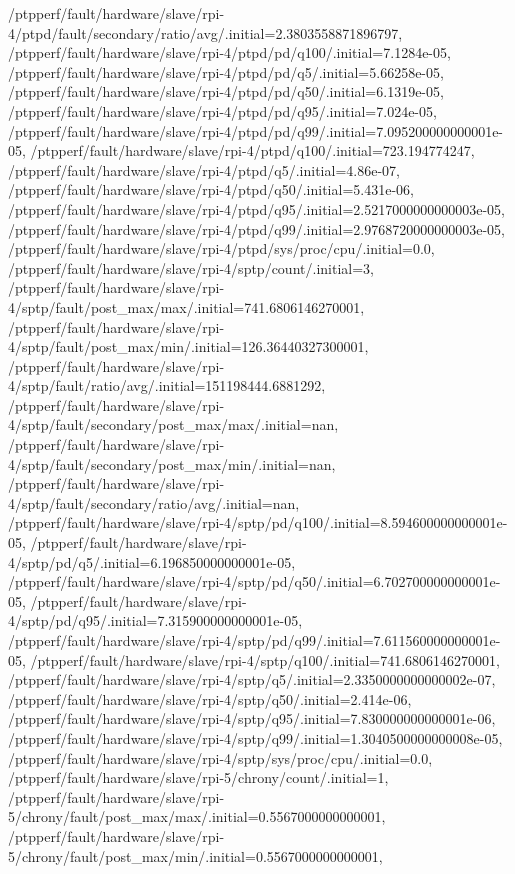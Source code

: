 {    /ptpperf/fault/hardware/slave/rpi-4/ptpd/fault/secondary/ratio/avg/.initial=2.3803558871896797,
    /ptpperf/fault/hardware/slave/rpi-4/ptpd/pd/q100/.initial=7.1284e-05,
    /ptpperf/fault/hardware/slave/rpi-4/ptpd/pd/q5/.initial=5.66258e-05,
    /ptpperf/fault/hardware/slave/rpi-4/ptpd/pd/q50/.initial=6.1319e-05,
    /ptpperf/fault/hardware/slave/rpi-4/ptpd/pd/q95/.initial=7.024e-05,
    /ptpperf/fault/hardware/slave/rpi-4/ptpd/pd/q99/.initial=7.095200000000001e-05,
    /ptpperf/fault/hardware/slave/rpi-4/ptpd/q100/.initial=723.194774247,
    /ptpperf/fault/hardware/slave/rpi-4/ptpd/q5/.initial=4.86e-07,
    /ptpperf/fault/hardware/slave/rpi-4/ptpd/q50/.initial=5.431e-06,
    /ptpperf/fault/hardware/slave/rpi-4/ptpd/q95/.initial=2.5217000000000003e-05,
    /ptpperf/fault/hardware/slave/rpi-4/ptpd/q99/.initial=2.9768720000000003e-05,
    /ptpperf/fault/hardware/slave/rpi-4/ptpd/sys/proc/cpu/.initial=0.0,
    /ptpperf/fault/hardware/slave/rpi-4/sptp/count/.initial=3,
    /ptpperf/fault/hardware/slave/rpi-4/sptp/fault/post_max/max/.initial=741.6806146270001,
    /ptpperf/fault/hardware/slave/rpi-4/sptp/fault/post_max/min/.initial=126.36440327300001,
    /ptpperf/fault/hardware/slave/rpi-4/sptp/fault/ratio/avg/.initial=151198444.6881292,
    /ptpperf/fault/hardware/slave/rpi-4/sptp/fault/secondary/post_max/max/.initial=nan,
    /ptpperf/fault/hardware/slave/rpi-4/sptp/fault/secondary/post_max/min/.initial=nan,
    /ptpperf/fault/hardware/slave/rpi-4/sptp/fault/secondary/ratio/avg/.initial=nan,
    /ptpperf/fault/hardware/slave/rpi-4/sptp/pd/q100/.initial=8.594600000000001e-05,
    /ptpperf/fault/hardware/slave/rpi-4/sptp/pd/q5/.initial=6.196850000000001e-05,
    /ptpperf/fault/hardware/slave/rpi-4/sptp/pd/q50/.initial=6.702700000000001e-05,
    /ptpperf/fault/hardware/slave/rpi-4/sptp/pd/q95/.initial=7.315900000000001e-05,
    /ptpperf/fault/hardware/slave/rpi-4/sptp/pd/q99/.initial=7.611560000000001e-05,
    /ptpperf/fault/hardware/slave/rpi-4/sptp/q100/.initial=741.6806146270001,
    /ptpperf/fault/hardware/slave/rpi-4/sptp/q5/.initial=2.3350000000000002e-07,
    /ptpperf/fault/hardware/slave/rpi-4/sptp/q50/.initial=2.414e-06,
    /ptpperf/fault/hardware/slave/rpi-4/sptp/q95/.initial=7.830000000000001e-06,
    /ptpperf/fault/hardware/slave/rpi-4/sptp/q99/.initial=1.3040500000000008e-05,
    /ptpperf/fault/hardware/slave/rpi-4/sptp/sys/proc/cpu/.initial=0.0,
    /ptpperf/fault/hardware/slave/rpi-5/chrony/count/.initial=1,
    /ptpperf/fault/hardware/slave/rpi-5/chrony/fault/post_max/max/.initial=0.5567000000000001,
    /ptpperf/fault/hardware/slave/rpi-5/chrony/fault/post_max/min/.initial=0.5567000000000001,
}
